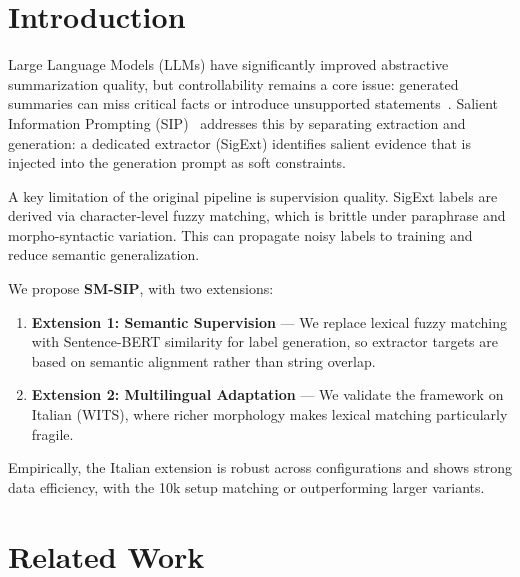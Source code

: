 \documentclass[conference]{IEEEtran}
\begin{document}
\section{Introduction}
Large Language Models (LLMs) have significantly improved abstractive summarization quality, but controllability remains a core issue: generated summaries can miss critical facts or introduce unsupported statements~\cite{maynez2020faithfulnessfactualityabstractivesummarization, cao-etal-2022-hallucinated}. Salient Information Prompting (SIP)~\cite{xu2024salientinformationpromptingsteer} addresses this by separating extraction and generation: a dedicated extractor (SigExt) identifies salient evidence that is injected into the generation prompt as soft constraints.

A key limitation of the original pipeline is supervision quality. SigExt labels are derived via character-level fuzzy matching, which is brittle under paraphrase and morpho-syntactic variation. This can propagate noisy labels to training and reduce semantic generalization.

We propose \textbf{SM-SIP}, with two extensions:

\begin{enumerate}
    \item \textbf{Extension 1: Semantic Supervision} --- We replace lexical fuzzy matching with Sentence-BERT similarity for label generation, so extractor targets are based on semantic alignment rather than string overlap.
    
    \item \textbf{Extension 2: Multilingual Adaptation} --- We validate the framework on Italian (WITS), where richer morphology makes lexical matching particularly fragile.
\end{enumerate}

Empirically, the Italian extension is robust across configurations and shows strong data efficiency, with the 10k setup matching or outperforming larger variants.

\section{Related Work}
\end{document}
